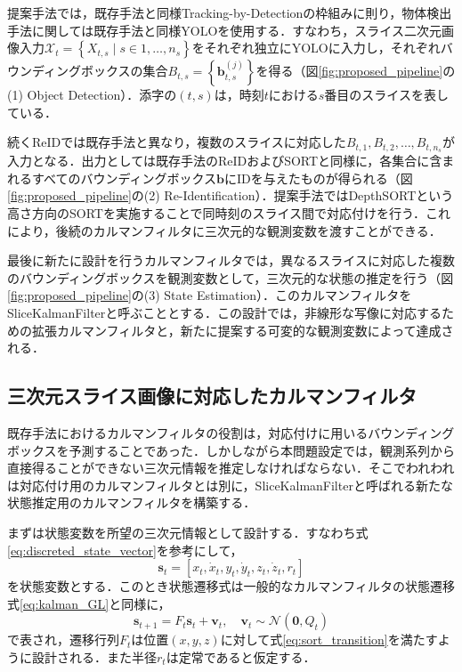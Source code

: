     提案手法では，既存手法と同様Tracking-by-Detectionの枠組みに則り，物体検出手法に関しては既存手法と同様YOLOを使用する．すなわち，スライス二次元画像入力$\mathcal{X}_t = \left\{X_{t, s} \mid s \in {1, \dots, n_s}\right\}$をそれぞれ独立にYOLOに入力し，それぞれバウンディングボックスの集合$B_{t,s} = \left\{\bm{b}_{t,s}^{(j)}\right\}$を得る（図\ref{fig:proposed_pipeline}の(1) Object Detection）．添字の$(t,s)$は，時刻$t$における$s$番目のスライスを表している．

    続くReIDでは既存手法と異なり，複数のスライスに対応した$B_{t,1}, B_{t,2}, \dots, B_{t,n_s}$が入力となる．出力としては既存手法のReIDおよびSORTと同様に，各集合に含まれるすべてのバウンディングボックス$\bm{b}$にIDを与えたものが得られる（図\ref{fig:proposed_pipeline}の(2) Re-Identification）．提案手法ではDepthSORTという高さ方向のSORTを実施することで同時刻のスライス間で対応付けを行う．これにより，後続のカルマンフィルタに三次元的な観測変数を渡すことができる．

    最後に新たに設計を行うカルマンフィルタでは，異なるスライスに対応した複数のバウンディングボックスを観測変数として，三次元的な状態の推定を行う（図\ref{fig:proposed_pipeline}の(3) State Estimation）．このカルマンフィルタをSliceKalmanFilterと呼ぶこととする．この設計では，非線形な写像に対応するための拡張カルマンフィルタと，新たに提案する可変的な観測変数によって達成される．


    \subsection{三次元スライス画像に対応したカルマンフィルタ}
    \label{subsec:sliced_kalman_filter}
    
    既存手法におけるカルマンフィルタの役割は，対応付けに用いるバウンディングボックスを予測することであった．しかしながら本問題設定では，観測系列から直接得ることができない三次元情報を推定しなければならない．そこでわれわれは対応付け用のカルマンフィルタとは別に，SliceKalmanFilterと呼ばれる新たな状態推定用のカルマンフィルタを構築する．
    
    まずは状態変数を所望の三次元情報として設計する．すなわち式\ref{eq:discreted_state_vector}を参考にして，
    \begin{equation}
        \label{eq:skf_state_vector}
        \bm{s}_t = \left[x_t, \dot{x}_t, y_t, \dot{y}_t, z_t, \dot{z}_t, r_t\right]
    \end{equation}
    を状態変数とする．このとき状態遷移式は一般的なカルマンフィルタの状態遷移式\ref{eq:kalman_GL}と同様に，
    \begin{equation}
        \label{eq:skf_state_transition}
        \bm{s}_{t+1} = F_t \bm{s}_t + \bm{v}_t, \quad \bm{v}_t \sim \mathcal{N}(\bm{0}, Q_t)
    \end{equation}
    で表され，遷移行列$F_t$は位置$(x,y,z)$に対して式\ref{eq:sort_transition}を満たすように設計される．また半径$r_t$は定常であると仮定する．

